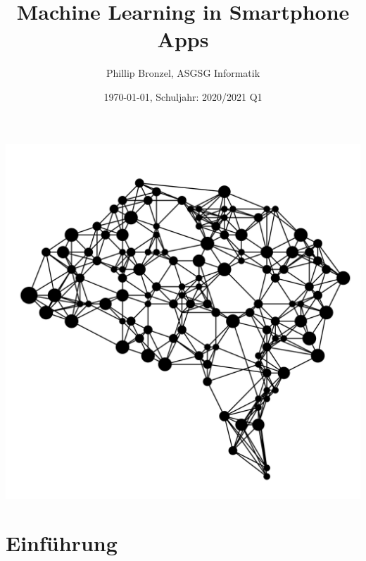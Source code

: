 \documentclass[12pt]{article}
\title{Machine Learning in Smartphone Apps}
\date{\today, Schuljahr: 2020/2021 Q1}
\author{Phillip Bronzel, ASGSG Informatik}
\begin{document}
  \maketitle
  \begin{center}
   \includegraphics[totalheight=10cm]{titlepage.png}
   \cite{titlepageimage}
  \end{center}

  \newpage
  \tableofcontents

  \newpage
  \section{Einführung}
  

  \newpage
  \printbibliography
\end{document}

